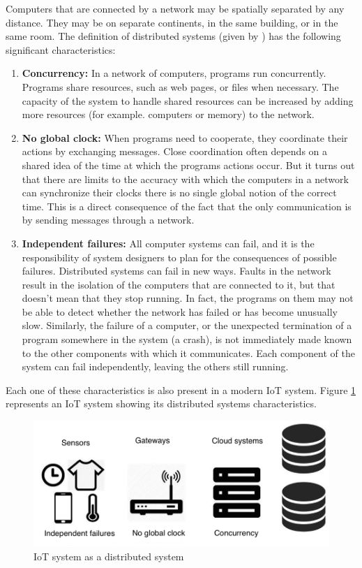 Computers that are connected by a network may be spatially separated by any
distance. They may be on separate continents, in the same building, or in the
same room. The definition of distributed systems (given by \cite{Coulouris})
has the following significant characteristics:

\begin{enumerate}

\item \textbf{Concurrency:} 
In a network of computers, programs run concurrently. Programs share resources,
such as web pages, or files when necessary. The capacity of the system to handle
shared resources can be increased by adding more resources (for example.
computers or memory) to the network.

\item \textbf{No global clock:}
When programs need to cooperate, they coordinate their actions
by exchanging messages. Close coordination often depends on a shared idea of
the time at which the programs actions occur. But it turns out that there are
limits to the accuracy with which the computers in a network can synchronize
their clocks there is no single global notion of the correct time. This is a
direct consequence of the fact that the only communication is by sending
messages through a network.

\item \textbf{Independent failures:}
All computer systems can fail, and it is the
responsibility of system designers to plan for the consequences of possible
failures. Distributed systems can fail in new ways. Faults in the network
result in the isolation of the computers that are connected to it, but that
doesn't mean that they stop running. In fact, the programs on them may not be
able to detect whether the network has failed or has become unusually slow.
Similarly, the failure of a computer, or the unexpected termination of a
program somewhere in the system (a crash), is not immediately made known to the
other components with which it communicates. Each component of the system can
fail independently, leaving the others still running.

\end{enumerate}

Each one of these characteristics is also present in a modern IoT system. 
Figure \ref{fig:3.1} represents an IoT system showing its distributed systems
characteristics. 

\begin{figure}[H]
\centering
\includegraphics[width=1\textwidth]{images/IoT_distributed.jpeg}
\caption{IoT system as a distributed system}
\label{fig:3.1}
\end{figure}


